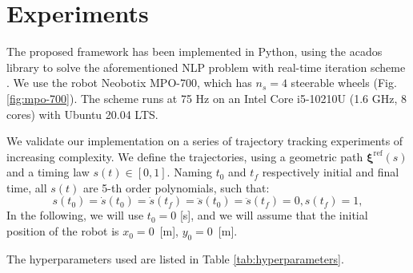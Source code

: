 
\section{Experiments}
\label{sec:simulations-and-experiments}
The proposed framework has been implemented in Python, using the acados library
\cite{Verschueren2021acados} to solve the aforementioned NLP problem with
real-time iteration scheme \cite{Gros2020Fromlineartononlinear}. We use the
robot Neobotix MPO-700, which has $n_s=4$ steerable wheels
(Fig. \ref{fig:mpo-700}). The scheme runs at 75 Hz on an Intel Core i5-10210U
(1.6 GHz, 8 cores) with Ubuntu 20.04 LTS.

We validate our implementation on a series of trajectory tracking experiments
of increasing complexity. We define the trajectories, using a geometric path
$\bm{\xi}^{\mathrm{ref}}(s)$ and a timing law $s(t) \in [0, 1]$. Naming $t_0$
and $t_f$ respectively initial and final time, all $s(t)$ are 5-th order
polynomials, such that:
\begin{equation*}
s(t_0) = \dot{s}(t_0) = \dot{s}(t_f) = \ddot{s}(t_0) = \ddot{s}(t_f)=0, s(t_f)=1,
\end{equation*}
In the following, we will use $t_0 = 0$ [s], and we will assume that the initial
position of the robot is $x_0 = 0$~[m], $y_0 = 0$~[m].

The hyperparameters used are listed in Table \ref{tab:hyperparameters}. %

